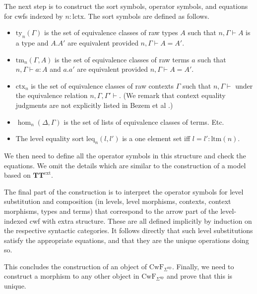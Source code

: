 \documentclass[11pt,a4paper]{article}
\theoremstyle{plain}
\theoremstyle{definition}
\newcommand{\UU}{\mathsf{U}}
\def\UU{\mathsf{U}}
\def\lctx{\mathrm{lctx}}
\def\ltm{\mathrm{ltm}}
\def\leq{\mathrm{leq}}
\newcommand{\ctx}{\mathrm{ctx}}
\newcommand{\ty}{\mathrm{ty}}
\newcommand{\tm}{\mathrm{tm}}
\newcommand{\Ta}{\mathrm{T}}
\def\CwF{\mathrm{CwF}}
\def\Sigmaint{{\Sigma^\mathrm{up}}}
\def\TText{{\mathbf{TT}^\mathrm{ext}}}
\begin{document}
The next step is to construct the sort symbols, operator symbols, and equations for cwfs indexed by $n : \lctx$. The sort symbols are defined as follows.
\begin{itemize}
\item $\ty_n(\Gamma)$ is the set of equivalence classes of raw types $A$ such that $n, \Gamma \vdash A$ is a type and $A.A'$ are equivalent provided $n, \Gamma \vdash A = A'$.
\item $\tm_n(\Gamma,A)$ is the set of equivalence classes of raw terms $a$ such that $n, \Gamma \vdash a : A$ and $a.a'$ are equivalent provided $n, \Gamma \vdash A = A'$.
\item $\ctx_n$ is the set of equivalence classes of raw contexts $\Gamma$ such that $n, \Gamma \vdash$ under the equivalence relation $n, \Gamma, \Gamma' \vdash$. (We remark that context equality judgments are not explicitly listed in Bezem et al \cite{BezemCDE22}.)
\item $\hom_n(\Delta,\Gamma)$ is the set of lists of equivalence classes of terms. Etc.
\item The level equality sort $\leq_n(l,l')$ is a one element set iff $l = l' : \ltm(n)$.
\end{itemize}
We then need to define all the operator symbols in this structure and check the equations. We omit the details which are similar to the construction of a model based on $\TText$.

The final part of the construction is to interpret the operator symbols for level substitution and composition (in levels, level morphisms, contexts, context morphisms, types and terms) that correspond to the arrow part of the level-indexed cwf with extra structure. These are all defined implicitly by induction on the respective syntactic categories. It follows directly that such level substitutions satisfy the appropriate equations, and that they are the unique operations doing so. 

This concludes the construction of an object of $\CwF_\Sigmaint$. Finally, we need to construct a morphism to any other object in $\CwF_\Sigmaint$ and prove that this is unique.


\end{document}
